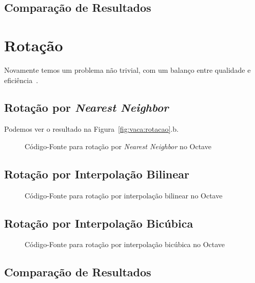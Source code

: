 \documentclass[12pt]{article}
\begin{document}
\subsection{Comparação de Resultados}\label{sec:redimensionamento:comparacao}

\section{Rotação}\label{sec:rotacao}

Novamente temos um problema não trivial, com um balanço entre qualidade e eficiência~\cite{kopf:2011}.
\subsection{Rotação por \textit{Nearest Neighbor}}\label{sec:rotacao:nearest}

Podemos ver o resultado na Figura~\ref{fig:vaca:rotacao}.b.

\begin{figure}[H]

\caption{Código-Fonte para rotação por \textit{Nearest Neighbor} no Octave}
\label{lst:rotate:nearest}
\end{figure}

\subsection{Rotação por Interpolação Bilinear}\label{sec:rotacao:bilinear}

\begin{figure}[H]

\caption{Código-Fonte para rotação por interpolação bilinear no Octave}
\label{lst:rotate:bilinear}
\end{figure}

\subsection{Rotação por Interpolação Bicúbica}\label{sec:rotacao:bicubica}

\begin{figure}[H]

\caption{Código-Fonte para rotação por interpolação bicúbica no Octave}
\label{lst:rotate:bicubic}
\end{figure}

\subsection{Comparação de Resultados}\label{sec:rotacao:comparacao}
\end{document}

